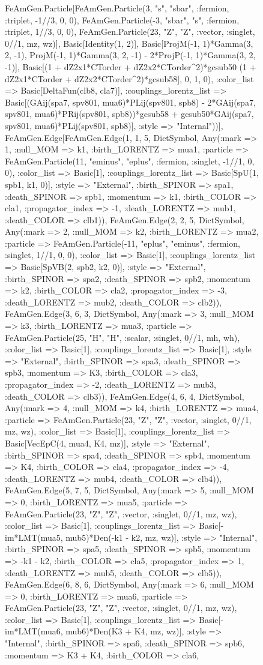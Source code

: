 \documentclass{revtex4}
\begin{document}
\begin{figure}[!htb]
\begin{center}
{FeAmGen.Particle[FeAmGen.Particle(3, "s", "sbar", :fermion, :triplet, -1//3, 0, 0), FeAmGen.Particle(-3, "sbar", "s", :fermion, :triplet, 1//3, 0, 0), FeAmGen.Particle(23, "Z", "Z", :vector, :singlet, 0//1, mz, wz)], Basic[Identity(1, 2)], Basic[ProjM(-1, 1)*Gamma(3, 2, -1), ProjM(-1, 1)*Gamma(3, 2, -1) - 2*ProjP(-1, 1)*Gamma(3, 2, -1)], Basic[(1 + dZ2x1*CTorder + dZ2x2*CTorder^2)*gcsub50 (1 + dZ2x1*CTorder + dZ2x2*CTorder^2)*gcsub58], 0, 1, 0), :color_list => Basic[DeltaFun(clb8, cla7)], :couplings_lorentz_list => Basic[(GAij(spa7, spv801, mua6)*PLij(spv801, spb8) - 2*GAij(spa7, spv801, mua6)*PRij(spv801, spb8))*gcsub58 + gcsub50*GAij(spa7, spv801, mua6)*PLij(spv801, spb8)], :style => "Internal"))], FeAmGen.Edge[FeAmGen.Edge(1, 1, 5, Dict{Symbol, Any}(:mark => 1, :null_MOM => k1, :birth_LORENTZ => mua1, :particle => FeAmGen.Particle(11, "eminus", "eplus", :fermion, :singlet, -1//1, 0, 0), :color_list => Basic[1], :couplings_lorentz_list => Basic[SpU(1, spb1, k1, 0)], :style => "External", :birth_SPINOR => spa1, :death_SPINOR => spb1, :momentum => k1, :birth_COLOR => cla1, :propagator_index => -1, :death_LORENTZ => mub1, :death_COLOR => clb1)), FeAmGen.Edge(2, 2, 5, Dict{Symbol, Any}(:mark => 2, :null_MOM => k2, :birth_LORENTZ => mua2, :particle => FeAmGen.Particle(-11, "eplus", "eminus", :fermion, :singlet, 1//1, 0, 0), :color_list => Basic[1], :couplings_lorentz_list => Basic[SpVB(2, spb2, k2, 0)], :style => "External", :birth_SPINOR => spa2, :death_SPINOR => spb2, :momentum => k2, :birth_COLOR => cla2, :propagator_index => -3, :death_LORENTZ => mub2, :death_COLOR => clb2)), FeAmGen.Edge(3, 6, 3, Dict{Symbol, Any}(:mark => 3, :null_MOM => k3, :birth_LORENTZ => mua3, :particle => FeAmGen.Particle(25, "H", "H", :scalar, :singlet, 0//1, mh, wh), :color_list => Basic[1], :couplings_lorentz_list => Basic[1], :style => "External", :birth_SPINOR => spa3, :death_SPINOR => spb3, :momentum => K3, :birth_COLOR => cla3, :propagator_index => -2, :death_LORENTZ => mub3, :death_COLOR => clb3)), FeAmGen.Edge(4, 6, 4, Dict{Symbol, Any}(:mark => 4, :null_MOM => k4, :birth_LORENTZ => mua4, :particle => FeAmGen.Particle(23, "Z", "Z", :vector, :singlet, 0//1, mz, wz), :color_list => Basic[1], :couplings_lorentz_list => Basic[VecEpC(4, mua4, K4, mz)], :style => "External", :birth_SPINOR => spa4, :death_SPINOR => spb4, :momentum => K4, :birth_COLOR => cla4, :propagator_index => -4, :death_LORENTZ => mub4, :death_COLOR => clb4)), FeAmGen.Edge(5, 7, 5, Dict{Symbol, Any}(:mark => 5, :null_MOM => 0, :birth_LORENTZ => mua5, :particle => FeAmGen.Particle(23, "Z", "Z", :vector, :singlet, 0//1, mz, wz), :color_list => Basic[1], :couplings_lorentz_list => Basic[-im*LMT(mua5, mub5)*Den(-k1 - k2, mz, wz)], :style => "Internal", :birth_SPINOR => spa5, :death_SPINOR => spb5, :momentum => -k1 - k2, :birth_COLOR => cla5, :propagator_index => 1, :death_LORENTZ => mub5, :death_COLOR => clb5)), FeAmGen.Edge(6, 8, 6, Dict{Symbol, Any}(:mark => 6, :null_MOM => 0, :birth_LORENTZ => mua6, :particle => FeAmGen.Particle(23, "Z", "Z", :vector, :singlet, 0//1, mz, wz), :color_list => Basic[1], :couplings_lorentz_list => Basic[-im*LMT(mua6, mub6)*Den(K3 + K4, mz, wz)], :style => "Internal", :birth_SPINOR => spa6, :death_SPINOR => spb6, :momentum => K3 + K4, :birth_COLOR => cla6, }
\end{center}
\end{figure}
\end{document}
